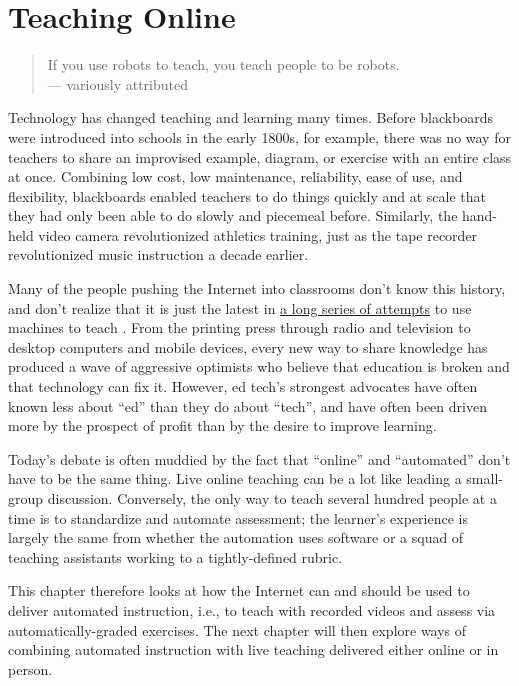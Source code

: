 \chapter{Teaching Online}\label{s:online}

\begin{quote}

  If you use robots to teach, you teach people to be robots. \\
  --- variously attributed

\end{quote}

Technology has changed teaching and learning many times. Before
blackboards were introduced into schools in the early 1800s, for
example, there was no way for teachers to share an improvised example,
diagram, or exercise with an entire class at once. Combining low cost,
low maintenance, reliability, ease of use, and flexibility, blackboards
enabled teachers to do things quickly and at scale that they had only
been able to do slowly and piecemeal before. Similarly, the hand-held
video camera revolutionized athletics training, just as the tape
recorder revolutionized music instruction a decade earlier.

Many of the people pushing the Internet into classrooms don't know
this history, and don't realize that it is just the latest in \href{http://teachingmachin.es/timeline.html}{a long
series of attempts} to use machines to teach
\cite{Watt2014}. From the printing press through radio and
television to desktop computers and mobile devices, every new way to
share knowledge has produced a wave of aggressive optimists who
believe that education is broken and that technology can fix
it. However, ed tech's strongest advocates have often known less about
``ed'' than they do about ``tech'', and have often been driven more by the
prospect of profit than by the desire to improve learning.

Today's debate is often muddied by the fact that ``online'' and
``automated'' don't have to be the same thing. Live online teaching
can be a lot like leading a small-group discussion. Conversely, the only
way to teach several hundred people at a time is to standardize and
automate assessment; the learner's experience is largely the same from
whether the automation uses software or a squad of teaching assistants
working to a tightly-defined rubric.

This chapter therefore looks at how the Internet can and should be used
to deliver automated instruction, i.e., to teach with recorded videos
and assess via automatically-graded exercises. The next chapter will
then explore ways of combining automated instruction with live teaching
delivered either online or in person.

